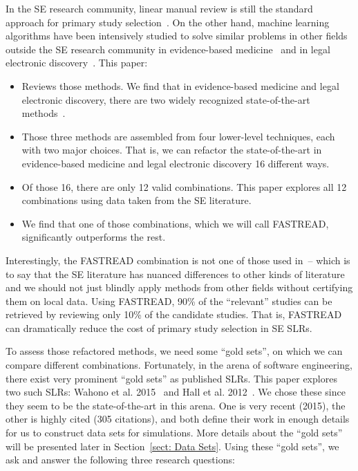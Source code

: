 \documentclass{svjour3}
\theoremstyle{break}
\begin{document}
In the SE research community, linear manual review is still the standard approach for primary study selection~\cite{kitchenham2013systematic}. On the other hand, machine learning algorithms have been intensively studied to solve similar problems in other fields outside the SE research community in evidence-based medicine~\cite{wallace2010semi,wallace2010active} and in
legal electronic discovery~\cite{cormack2014evaluation,cormack2015autonomy}. This paper:
\begin{itemize}
\item
Reviews those methods. We find that in evidence-based medicine and legal electronic discovery, there are two widely recognized state-of-the-art methods~\cite{cormack2014evaluation,wallace2010semi}.
\item
Those three methods are assembled from four lower-level techniques, each with two major choices.
That is, we can refactor the state-of-the-art in evidence-based medicine and legal electronic discovery 16 different ways.
\item
Of those 16, there are only 12 valid combinations. This paper explores all 12 combinations using data taken from the SE literature.
\item
We find that one of those combinations, which we will call FASTREAD, significantly outperforms the rest.
\end{itemize}
Interestingly, the FASTREAD combination is not one of those used
in~\cite{cormack2014evaluation,wallace2010semi}-- which is to say that the SE literature has nuanced differences to other kinds of literature and we should not just blindly
apply methods from other fields without certifying them on local data.
Using FASTREAD, 90\% of the ``relevant'' studies can be retrieved by reviewing only 10\% of the candidate studies. That is, FASTREAD can dramatically reduce the cost of primary study selection in SE SLRs.
   

To assess those refactored methods,
we need some ``gold sets'',
on which we can compare different combinations. Fortunately, in the arena of software
engineering, there exist very prominent ``gold sets'' as published SLRs. This paper explores two such SLRs: Wahono et al. 2015~\cite{wahono2015systematic} and Hall et
al. 2012~\cite{hall2012systematic}.  We chose these since they seem to be the
state-of-the-art in this arena. One is very recent (2015), the other is highly
cited (305 citations), and both define their work in enough details for us to construct data sets for simulations. 
More details about the ``gold
sets'' will be presented later in Section~\ref{sect: Data Sets}. Using
these ``gold sets'', we ask and answer the following three research questions:
\end{document}

